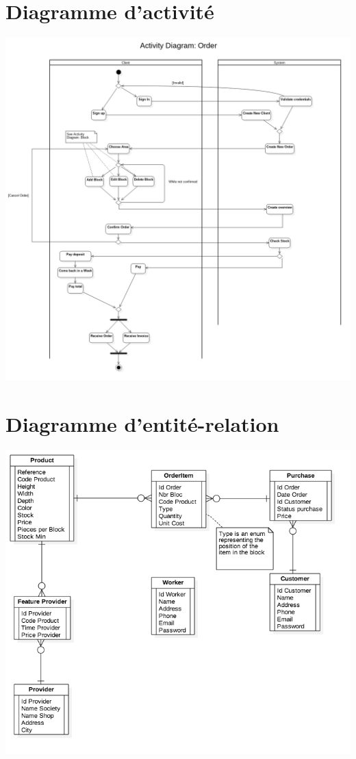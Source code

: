 \documentclass{ecam}
\begin{document}
\section{Diagramme d'activité}
\begin{center}
\includegraphics[angle=0,scale=0.3]{../images/activity-diagram.png}
\end{center}

\section{Diagramme d'entité-relation}
\begin{center}
\includegraphics[angle=0,scale=0.4]{../images/ERDDiagram.png}
\end{center}
\end{document}
